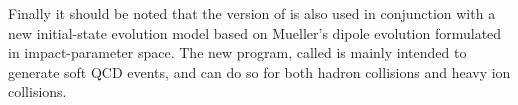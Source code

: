 Finally it should be noted that the \Cpp version of \Ariadne is also
used in conjunction with a new initial-state evolution model
\cite{Avsar:2005iz,Avsar:2006jy,Avsar:2007xg} based on Mueller's
dipole evolution \cite{Mueller:1993rr,Mueller:1994jq,Mueller:1994gb}
formulated in impact-parameter space. The new program, called \llDIPSY
\cite{Flensburg:2010xx} is mainly intended to generate soft QCD
events, and can do so for both hadron collisions and heavy ion
collisions.

